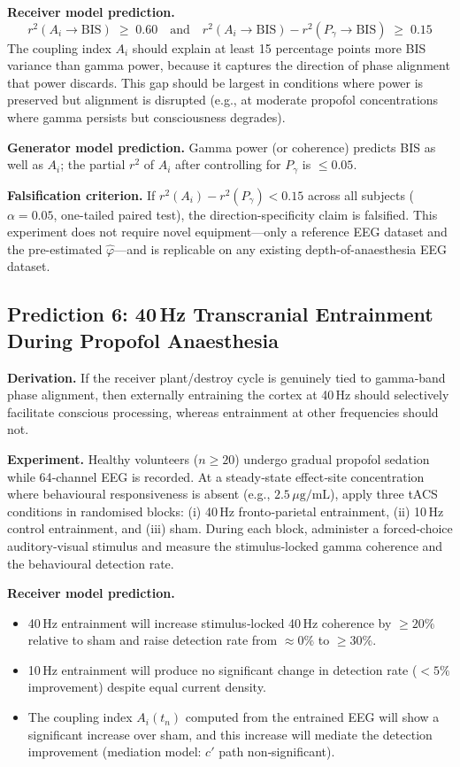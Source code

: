 \documentclass[12pt]{article}
\begin{document}
\textbf{Receiver model prediction.}
\begin{equation}
    r^2(A_i \to \mathrm{BIS}) \;\geq\; 0.60
    \quad\text{and}\quad
    r^2(A_i \to \mathrm{BIS}) - r^2(P_\gamma \to \mathrm{BIS}) \;\geq\; 0.15
\end{equation}
The coupling index $A_i$ should explain at least 15 percentage points more BIS variance than gamma power, because it captures the direction of phase alignment that power discards. This gap should be largest in conditions where power is preserved but alignment is disrupted (e.g., at moderate propofol concentrations where gamma persists but consciousness degrades).

\textbf{Generator model prediction.} Gamma power (or coherence) predicts BIS as well as $A_i$; the partial $r^2$ of $A_i$ after controlling for $P_\gamma$ is $\leq 0.05$.

\textbf{Falsification criterion.} If $r^2(A_i) - r^2(P_\gamma) < 0.15$ across all subjects ($\alpha = 0.05$, one-tailed paired test), the direction-specificity claim is falsified. This experiment does not require novel equipment---only a reference EEG dataset and the pre-estimated $\hat{\varphi}$---and is replicable on any existing depth-of-anaesthesia EEG dataset.

\subsection{Prediction 6: 40\,Hz Transcranial Entrainment During Propofol Anaesthesia}

\textbf{Derivation.} If the receiver plant/destroy cycle is genuinely tied to gamma‑band phase alignment, then externally entraining the cortex at 40\,Hz should selectively facilitate conscious processing, whereas entrainment at other frequencies should not.

\textbf{Experiment.} Healthy volunteers ($n \geq 20$) undergo gradual propofol sedation while 64‑channel EEG is recorded. At a steady‑state effect‑site concentration where behavioural responsiveness is absent (e.g., $2.5\,\mu\mathrm{g/mL}$), apply three tACS conditions in randomised blocks: (i) 40\,Hz fronto‑parietal entrainment, (ii) 10\,Hz control entrainment, and (iii) sham. During each block, administer a forced‑choice auditory‑visual stimulus and measure the stimulus‑locked gamma coherence and the behavioural detection rate.

\textbf{Receiver model prediction.}
\begin{itemize}
    \item 40\,Hz entrainment will increase stimulus‑locked 40\,Hz coherence by $\geq 20\%$ relative to sham and raise detection rate from $\approx 0\%$ to $\geq 30\%$.
    \item 10\,Hz entrainment will produce no significant change in detection rate ($< 5\%$ improvement) despite equal current density.
    \item The coupling index $A_i(t_n)$ computed from the entrained EEG will show a significant increase over sham, and this increase will mediate the detection improvement (mediation model: $c'$ path non‑significant).
\end{itemize}
\end{document}
